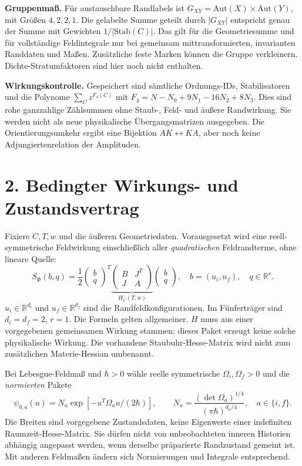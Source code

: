 \documentclass[10pt,a4paper]{article}
\newcommand{\R}{\mathbb R}
\newcommand{\sect}[1]{\section*{\color{navy}#1}}
\begin{document}
\textbf{Gruppenmaß.} Für austauschbare Randlabels ist
$G_{XY}=\mathrm{Aut}(X)\times\mathrm{Aut}(Y)$, mit Größen $4,2,2,1$.
Die gelabelte Summe geteilt durch $|G_{XY}|$ entspricht genau der Summe
mit Gewichten $1/|\mathrm{Stab}(C)|$. Das gilt für die Geometriesumme und
für vollständige Feldintegrale nur bei gemeinsam mittransformierten,
invarianten Randdaten und Maßen. Zusätzliche feste Marken können die Gruppe
verkleinern. Dichte-Stratumfaktoren sind hier noch nicht enthalten.

\textbf{Wirkungskontrolle.} Gespeichert sind sämtliche Ordnungs-IDs,
Stabilisatoren und die Polynome $\sum_Cz^{F_4(C)}$ mit
$F_4=N-N_0+9N_1-16N_2+8N_3$. Dies sind rohe ganzzahlige Zählsummen ohne
Staub-, Feld- und äußere Randwirkung. Sie werden nicht als neue physikalische
Übergangsmatrizen ausgegeben. Die Orientierungsumkehr ergibt eine Bijektion
$AK\leftrightarrow KA$, aber noch keine Adjungiertenrelation der Amplituden.

\newpage
\sect{2. Bedingter Wirkungs- und Zustandsvertrag}
Fixiere $C,T,w$ und die äußeren Geometriedaten. Vorausgesetzt wird eine
reell-symmetrische Feldwirkung einschließlich aller \emph{quadratischen}
Feldrandterme, ohne lineare Quelle:
\[
S_\Phi(b,q)=\frac12
\begin{pmatrix}b\\q\end{pmatrix}^{\!T}
\underbrace{\begin{pmatrix}B&J^T\\J&A\end{pmatrix}}_{H_C(T,w)}
\begin{pmatrix}b\\q\end{pmatrix},
\quad b=(u_i,u_f),\quad q\in\R^r.
\]
$u_i\in\R^{d_i}$ und $u_f\in\R^{d_f}$ sind die Randfeldkonfigurationen.
Im Fünferträger sind $d_i=d_f=2$, $r=1$. Die Formeln gelten allgemeiner.
$H$ muss aus einer vorgegebenen gemeinsamen Wirkung stammen; dieses Paket
erzeugt keine solche physikalische Wirkung. Die vorhandene Staubuhr-Hesse-Matrix
wird nicht zum zusätzlichen Materie-Hessian umbenannt.

Bei Lebesgue-Feldmaß und $\hbar>0$ wähle reelle symmetrische
$\Omega_i,\Omega_f>0$ und die \emph{normierten} Pakete
\[
\psi_{0,a}(u)=N_a\exp[-u^T\Omega_au/(2\hbar)],
\qquad N_a=\frac{(\det\Omega_a)^{1/4}}{(\pi\hbar)^{d_a/4}},
\quad a\in\{i,f\}.
\]
Die Breiten sind vorgegebene Zustandsdaten, keine Eigenwerte einer indefiniten
Raumzeit-Hesse-Matrix. Sie dürfen nicht von unbeobachteten inneren Historien
abhängig angepasst werden, wenn derselbe präparierte Randzustand gemeint ist.
Mit anderen Feldmaßen ändern sich Normierungen und Integrale entsprechend.
\end{document}
